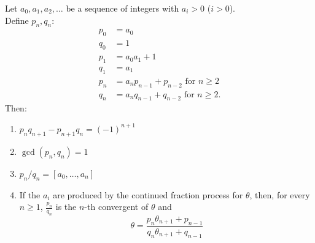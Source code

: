 \documentclass[NumTh.tex]{subfiles}
\begin{document}
\begin{lemma}\label{1_2_1}
  Let $a_0,a_1,a_2,\dots$ be a sequence of integers with $a_i > 0$ ($i>0$).\\
  Define $p_n,q_n$:
  \begin{align}
    p_0 &= a_0\\
    q_0 &= 1\\
    p_1 &= a_0 a_1 + 1\\
    q_1 &= a_1\\
    p_n &= a_n p_{n-1} + p_{n - 2} \text{ for } n \geq 2\\
    q_n &= a_n q_{n-1} + q_{n-2} \text{ for } n \geq 2.
  \end{align}
  Then:
  \begin{enumerate} %
    \item $p_n q_{n+1} - p_{n+1} q_n = (-1)^{n+1}$
    \item $\gcd(p_n,q_n) = 1$
    \item $p_n/q_n = [a_0,\dots,a_n]$
    \item If the $a_i$ are produced by the continued fraction process for $\theta$, then, for every $n \geq 1$, $\frac{p_n}{q_n}$ is the $n$-th convergent of $\theta$ and
    \[ \theta = \frac{p_n \theta_{n+1} + p_{n-1}}{q_n \theta_{n+1} + q_{n-1}} \]
  \end{enumerate}
\end{lemma}
\end{document}
